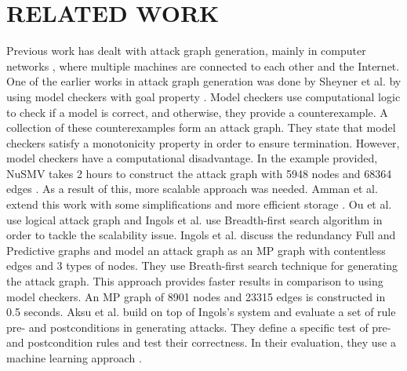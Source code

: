 \section{RELATED WORK}
\label{chap:related_work}

Previous work has dealt with attack graph generation, mainly in computer networks \cite{ingols2006practical, sheyner2002automated, ritchey2000using, ou2006scalable}, where multiple machines are connected to each other and the Internet. %
One of the earlier works in attack graph generation was done by Sheyner et al. by using model checkers with goal property \cite{sheyner2002automated}. Model checkers use computational logic to check if a model is correct, and otherwise, they provide a counterexample. A collection of these counterexamples form an attack graph. They state that model checkers satisfy a monotonicity property in order to ensure termination. However, model checkers have a computational disadvantage. In the example provided, NuSMV takes 2 hours to construct the attack graph with 5948 nodes and 68364 edges \cite{sheyner2002automated}. As a result of this, more scalable approach was needed. Amman et al. extend this work with some simplifications and more efficient storage \cite{ritchey2000using}. Ou et al. use logical attack graph \cite{ou2006scalable} and Ingols \cite{ingols2006practical} et al. use Breadth-first search algorithm in order to tackle the scalability issue. Ingols et al. discuss the redundancy Full and Predictive graphs and model an attack graph as an MP graph with contentless edges and 3 types of nodes. They use Breath-first search technique for generating the attack graph. This approach provides faster results in comparison to using model checkers. An MP graph of 8901 nodes and 23315 edges is constructed in 0.5 seconds. Aksu et al. build on top of Ingols's system and evaluate a set of rule pre- and postconditions in generating attacks. They define a specific test of pre- and postcondition rules and test their correctness. In their evaluation, they use a machine learning approach \cite{aksu2018automated}.

